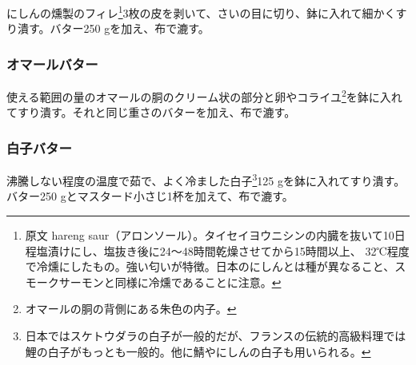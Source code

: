 \begin{recette}
にしんの燻製のフィレ\footnote{原文 hareng
  saur（アロンソール）。タイセイヨウニシンの内臓を抜いて10日程塩漬けにし、塩抜き後に24〜48時間乾燥させてから15時間以上、
  32℃程度で冷燻にしたもの。強い匂いが特徴。日本のにしんとは種が異なること、スモークサーモンと同様に冷燻であることに注意。}3枚の皮を剥いて、さいの目に切り、鉢に入れて細かくすり潰す。バター250
gを加え、布で漉す。

\hypertarget{beurre-de-homard}{%
\subsubsection{オマールバター}\label{beurre-de-homard}}



使える範囲の量のオマールの胴のクリーム状の部分と卵やコライユ\footnote{オマールの胴の背側にある朱色の内子。}を鉢に入れてすり潰す。それと同じ重さのバターを加え、布で漉す。

\hypertarget{beurre-de-laitance}{%
\subsubsection{白子バター}\label{beurre-de-laitance}}



沸騰しない程度の温度で茹で、よく冷ました白子\footnote{日本ではスケトウダラの白子が一般的だが、フランスの伝統的高級料理では鯉の白子がもっとも一般的。他に鯖やにしんの白子も用いられる。}125
gを鉢に入れてすり潰す。バター250
gとマスタード小さじ1杯を加えて、布で漉す。

\hypertarget{beurre-maitre-d-hotel}{%
}
\end{recette}
